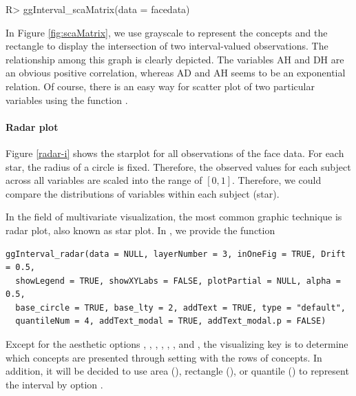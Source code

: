 \documentclass[article]{jss}
\begin{document}
\begin{CodeChunk}
\begin{CodeInput}
R> ggInterval_scaMatrix(data = facedata)
\end{CodeInput}
\end{CodeChunk}



In Figure \ref{fig:scaMatrix}, we use grayscale to represent the concepts and the rectangle to display the intersection of two interval-valued observations. The relationship among this graph is clearly depicted. The variables AH and DH are an obvious positive correlation, whereas AD and AH seems to be an exponential relation. Of course, there is an easy way for scatter plot of two particular variables using the function . 




\paragraph{Radar plot}
Figure \ref{radar-i} shows
the starplot for all observations of the face data. For
each star, the radius of a circle is fixed. Therefore, the observed
values for each subject across all variables are scaled into the range of
$[0, 1]$. Therefore, we could compare the distributions of variables
within each subject (star).

In the field of multivariate visualization, the most common graphic technique is radar plot, also known as star plot. In , we provide the function

\begin{verbatim}
ggInterval_radar(data = NULL, layerNumber = 3, inOneFig = TRUE, Drift = 0.5, 
  showLegend = TRUE, showXYLabs = FALSE, plotPartial = NULL, alpha = 0.5, 
  base_circle = TRUE, base_lty = 2, addText = TRUE, type = "default",
  quantileNum = 4, addText_modal = TRUE, addText_modal.p = FALSE)
\end{verbatim}

Except for the aesthetic options , , , , , , and , the visualizing key is to determine which concepts are presented through setting  with the rows of concepts. In addition, it will be decided to use area (), rectangle (), or quantile () to represent the interval by option .
\end{document}
